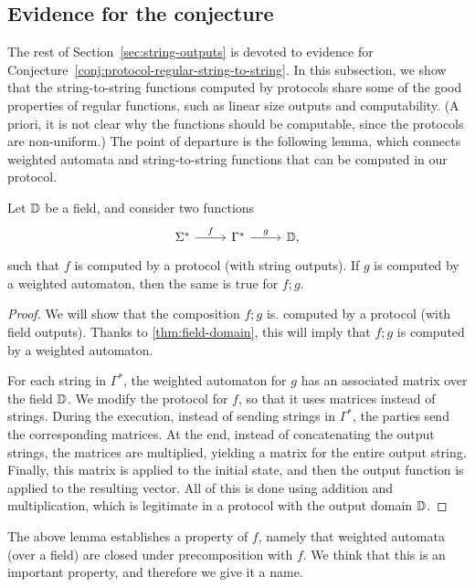 \subsection{Evidence for the conjecture}
\label{sec:continuity}
The rest of Section~\ref{sec:string-outputs} is devoted to  evidence for Conjecture~\ref{conj:protocol-regular-string-to-string}.
In this subsection, we show that the string-to-string functions computed by protocols share some of the good properties of regular functions, such as linear size outputs and computability. (A priori, it is not clear why the functions should be computable, since the protocols are non-uniform.) The point of departure is the following lemma, which connects weighted automata and string-to-string functions that can be computed in our protocol.

    \begin{lemma}
        \label{lem:postcomposition-weighted-automaton}
        Let $\mathbb D$ be a field, and consider two functions
        \[
        \begin{tikzcd}
        \Sigma^* 
        \ar[r,"f"]
        &
        \Gamma^*
        \ar[r,"g"]
        & 
        \domain,
        \end{tikzcd}
        \]
        such that $f$ is computed by a protocol (with string outputs). If $g$  is computed by a weighted automaton, then the same is true for  $f;g$.
    \end{lemma}
    \begin{proof}
        We will show that the composition $f;g$ is. computed by a protocol (with field outputs). Thanks to \cref{thm:field-domain}, this will imply that $f;g$ is computed by a weighted automaton.

        For each string in $\Gamma^*$, the weighted automaton for $g$ has an associated matrix over the field $\mathbb D$. We modify the protocol for $f$, so that it uses matrices instead of strings. During the execution, instead of sending strings in $\Gamma^*$, the parties send  the corresponding matrices. At the end, instead of concatenating the output strings, the matrices are multiplied, yielding a matrix for the entire output string. Finally, this matrix is applied to the initial state, and then the output function is applied to the resulting vector. All of this is done using addition and multiplication, which is legitimate in a protocol with the output domain $\mathbb D$.
    \end{proof}


The above lemma establishes a property of $f$, namely that weighted automata (over a field) are closed under precomposition with $f$. We think that this is an important property, and therefore we give it a name.


